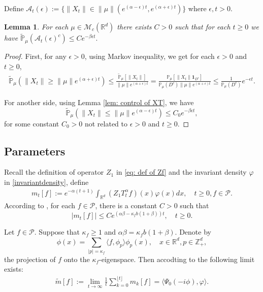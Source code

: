 \documentclass[12pt,oneside,english]{amsart}
\theoremstyle{plain}
\newtheorem{lem}[thm]{Lemma}
\theoremstyle{definition}
\numberwithin{equation}{section}
\newcommand{\added}[1]{{\color{blue}#1}}\newcommand{\deleted}[1]{{\color{red}#1}}
\begin{document}
\added{
	Define $\mathcal{A}_t(\epsilon):=\{ \|X_t\|\in \|\mu\|(e^{(\alpha-\epsilon)t},e^{(\alpha+\epsilon)t})\}$ where $\epsilon,t>0$.

\begin{lem}\label{lem: control of AT}
  For each $\mu \in \mathcal{M}_c(\mathbb{R}^d)$ there exists $C>0$ such that for each $t\geq 0$ we have
  $
  \mathbb{\tilde{P}}_{\mu}\left(\mathcal{A}_t(\epsilon)^c\right)\leq C e^{-\beta\epsilon t}.
  $
\end{lem}

\begin{proof}
    First, for any $\epsilon>0$, using Markov inequality, we get for each $\epsilon>0$ and $t\geq 0$,
\begin{align}
    \mathbb{\tilde{P}}_{\mu}(\|X_t\|\geq\|\mu\|e^{(\alpha+\epsilon)t})
    \leq\frac{\mathbb{\tilde{P}}_{\mu}[\|X_t\|]}{\|\mu\|e^{(\alpha+\epsilon)t}}
	= \frac{\mathbb P_\mu[\|X_t\|\mathbf 1_{D^c}]}{\mathbb P_\mu(D^c)\|\mu\|e^{(\alpha+\epsilon)t}}
    \leq \frac{1}{\mathbb{P}_{\mu}(D^c)}e^{-\epsilon t}.
\end{align}

    For another side, using Lemma \ref{lem: control of XT}, we have
    $$\mathbb{\tilde{P}}_{\mu}\left(\|X_t\|\leq \|\mu\|e^{(\alpha-\epsilon)t}\right)\leq C_0 e^{-\beta\epsilon t}, $$
     for some constant $C_0>0$ not related to $\epsilon>0$ and $t\geq 0$.
\end{proof}
}
\subsection{Parameters}
 Recall the definition of operator $Z_1$ in \eqref{eq: def of Zf} and the invariant density $\varphi$ in \eqref{invariantdensity}, define
 \begin{align}\label{parameter_mk}
      m_t[f]:=e^{-\alpha (t+1)}\int_{\mathbb R^d} (Z_1T_t^{\alpha}f)(x)\varphi(x)dx,\quad t\geq 0, f\in \mathcal P.
 \end{align}
According to \cite[Lemma 2.7]{MM}, for each $f\in\mathcal{P}$, there is a constant $C>0$ such that
\[
    |m_t[f]|
    \leq C e^{(\alpha\beta-\kappa_fb(1+\beta))t},
    \quad t\geq 0.
\]

    Let $f \in \mathcal{P}$.
    Suppose that $\kappa_f\geq 1$ and $\alpha\beta=\kappa_f b(1+\beta)$.
    Denote by
\[
    \phi(x)
    =\sum_{|p|=\kappa_f}\langle f, \phi_p\rangle\phi_p(x),
    \quad x\in \mathbb{R}^d, p \in\mathbb Z_+^d,
\]
    the projection of $f$ onto the $\kappa_f$-eigenspace.
    Then accodting to \cite[Lemma 4.2]{MM} the following limit exists:
\begin{align}
\label{para: critical case}
    \tilde{m}[f]:=\lim_{t\rightarrow \infty}\frac{1}{t}\sum_{k=0}^{\lfloor t \rfloor}m_k[f]=\langle\Psi_0(-i\phi),\varphi\rangle.
\end{align}
\end{document}
